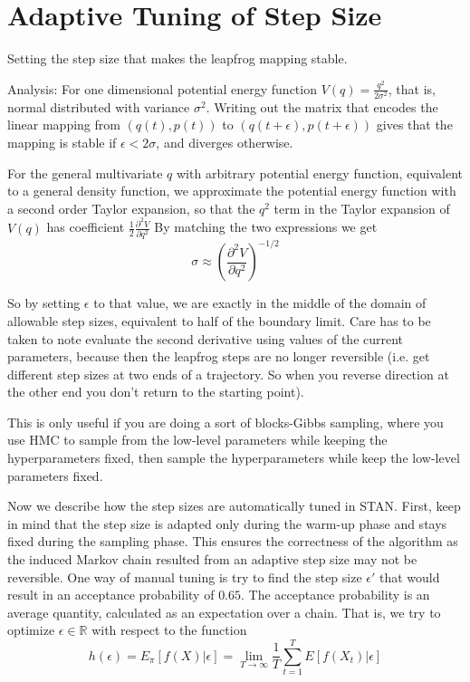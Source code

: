 \documentclass[]{report}
\begin{document}
\section{Adaptive Tuning of Step Size}

Setting the step size that makes the leapfrog mapping stable.

Analysis: For one dimensional potential energy function $V(q) = \frac{q^2}{2\sigma^2}$,
that is, normal distributed with variance $\sigma^2$. Writing out the matrix that encodes the linear mapping from $(q(t),p(t))$ to $(q(t+\epsilon),p(t+\epsilon))$ gives that the mapping is stable if $\epsilon < 2 \sigma$, and diverges otherwise. 

For the general multivariate $q$ with arbitrary potential energy function, equivalent to a general density function, we approximate the potential energy function with a second order Taylor expansion, so that the $q^2$ term in the Taylor expansion of $V(q)$ has coefficient $\frac{1}{2} \frac{\partial^2 V}{\partial q^2}$  
By matching the two expressions we get 
\[ \sigma \approx ( \frac{\partial^2 V}{\partial q^2})^{-1/2} \]

So by setting $\epsilon$ to that value, we are exactly in the middle of the domain of allowable step sizes, equivalent to half of the boundary limit.
Care has to be taken to note evaluate the second derivative using values of the current parameters, because then the leapfrog steps are no longer reversible (i.e. get different step sizes at two ends of a trajectory. So when you reverse direction at the other end you don't return to  the starting point). 

This is only useful if you are doing a sort of blocks-Gibbs sampling, where you use HMC to sample from the low-level parameters while keeping the hyperparameters fixed, then sample the hyperparameters while keep the low-level parameters fixed. 


Now we describe how the step sizes are automatically tuned in STAN. First, keep
in mind that the step size is adapted only during the warm-up phase and stays
fixed during the sampling phase. This ensures the correctness of the algorithm
as the induced Markov chain resulted from an adaptive step size may not be
reversible. One way of manual tuning is try to find the step size
$\epsilon'$ that would result in an acceptance probability of $0.65$. The
acceptance probability is an average quantity, calculated as an expectation
over a chain. That is, we try to optimize $\epsilon \in \mathbb{R}$ with respect
to the function 
\[ h(\epsilon) = E_\pi[f(X)|\epsilon]  = \lim_{T \rightarrow \infty} \frac{1}{T}
\sum_{t=1}^T E[f(X_t)|\epsilon] \]
\end{document}

